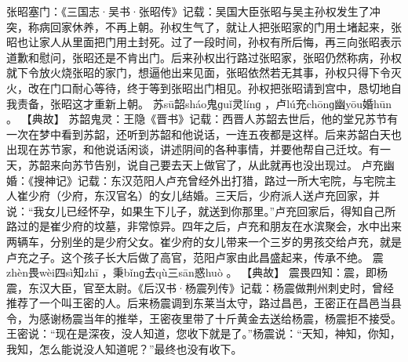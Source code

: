 \documentclass[12pt,UTF8]{ctexbook}
\begin{document}
张昭塞门：《三国志·吴书·张昭传》记载：吴国大臣张昭与吴主孙权发生了冲突，称病回家休养，不再上朝。孙权生气了，就让人把张昭家的门用土堵起来，张昭也让家人从里面把门用土封死。过了一段时间，孙权有所后悔，再三向张昭表示道歉和慰问，张昭还是不肯出门。后来孙权出行路过张昭家，张昭仍然称病，孙权就下令放火烧张昭的家门，想逼他出来见面，张昭依然若无其事，孙权只得下令灭火，改在门口耐心等待，终于等到张昭出门相见。孙权把张昭请到宫中，恳切地自我责备，张昭这才重新上朝。
苏sū韶sháo鬼ɡuǐ灵línɡ
，卢lú充chōnɡ幽yōu婚hūn
。
【典故】
苏韶鬼灵：王隐《晋书》记载：西晋人苏韶去世后，他的堂兄苏节有一次在梦中看到苏韶，还听到苏韶和他说话，一连五夜都是这样。后来苏韶白天也出现在苏节家，和他说话闲谈，讲述阴间的各种事情，并要他帮自己迁坟。有一天，苏韶来向苏节告别，说自己要去天上做官了，从此就再也没出现过。
卢充幽婚：《搜神记》记载：东汉范阳人卢充曾经外出打猎，路过一所大宅院，与宅院主人崔少府（少府，东汉官名）的女儿结婚。三天后，少府派人送卢充回家，并说：“我女儿已经怀孕，如果生下儿子，就送到你那里。”卢充回家后，得知自己所路过的是崔少府的坟墓，非常惊异。四年之后，卢充和朋友在水滨聚会，水中出来两辆车，分别坐的是少府父女。崔少府的女儿带来一个三岁的男孩交给卢充，就是卢充之子。这个孩子长大后做了高官，范阳卢家由此昌盛起来，传承不绝。
震zhèn畏wèi四sì知zhī
，秉bǐnɡ去qù三sān惑huò
。
【典故】
震畏四知：震，即杨震，东汉大臣，官至太尉。《后汉书·杨震列传》记载：杨震做荆州刺史时，曾经推荐了一个叫王密的人。后来杨震调到东莱当太守，路过昌邑，王密正在昌邑当县令，为感谢杨震当年的推举，王密夜里带了十斤黄金去送给杨震，杨震拒不接受。王密说：“现在是深夜，没人知道，您收下就是了。”杨震说：“天知，神知，你知，我知，怎么能说没人知道呢？”最终也没有收下。
\end{document}
